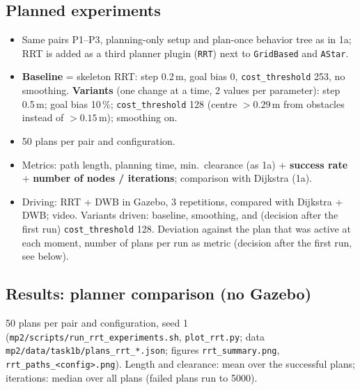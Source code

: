 \documentclass[10pt]{article}
\newcommand{\pkg}[1]{\texttt{#1}}
\begin{document}
\subsection{Planned experiments}
\begin{itemize}
  \item Same pairs P1--P3, planning-only setup and plan-once behavior tree as in 1a; RRT is added as a third planner
        plugin (\pkg{RRT}) next to \pkg{GridBased} and \pkg{AStar}.
  \item \textbf{Baseline} = skeleton RRT: step 0.2\,m, goal bias 0, \pkg{cost\_threshold} 253, no smoothing.
        \textbf{Variants} (one change at a time, 2 values per parameter): step 0.5\,m; goal bias 10\,\%;
        \pkg{cost\_threshold} 128 (centre $> 0.29$\,m from obstacles instead of $> 0.15$\,m); smoothing on.
  \item 50 plans per pair and configuration.
  \item Metrics: path length, planning time, min.\ clearance (as 1a) + \textbf{success rate} + \textbf{number of
        nodes / iterations}; comparison with Dijkstra (1a).
  \item Driving: RRT + DWB in Gazebo, 3 repetitions, compared with Dijkstra + DWB; video. Variants driven: baseline,
        smoothing, and (decision after the first run) \pkg{cost\_threshold} 128. Deviation against the plan that was
        active at each moment, number of plans per run as metric (decision after the first run, see below).
\end{itemize}

\subsection{Results: planner comparison (no Gazebo)}
50 plans per pair and configuration, seed 1 (\pkg{mp2/scripts/run\_rrt\_experiments.sh}, \pkg{plot\_rrt.py};
data \pkg{mp2/data/task1b/plans\_rrt\_*.json}; figures \pkg{rrt\_summary.png}, \pkg{rrt\_paths\_<config>.png}).
Length and clearance: mean over the successful plans; iterations: median over all plans (failed plans run to 5000).
\end{document}
